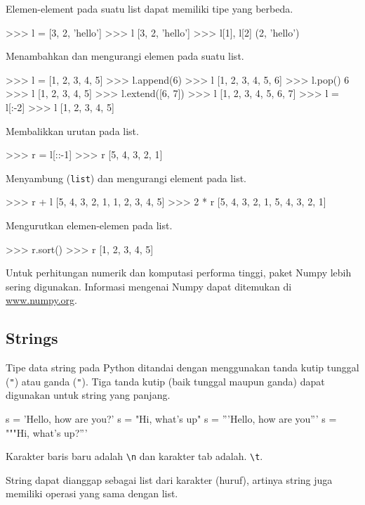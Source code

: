\documentclass[a4paper,11pt]{extarticle}
\begin{document}
Elemen-element pada suatu list dapat memiliki tipe yang berbeda.
\begin{pyconcode}
>>> l = [3, 2, 'hello']
>>> l
[3, 2, 'hello']
>>> l[1], l[2]
(2, 'hello')
\end{pyconcode}

Menambahkan dan mengurangi elemen pada suatu list.
\begin{pyconcode}
>>> l = [1, 2, 3, 4, 5]
>>> l.append(6)
>>> l
[1, 2, 3, 4, 5, 6]
>>> l.pop()
6
>>> l
[1, 2, 3, 4, 5]
>>> l.extend([6, 7])
>>> l
[1, 2, 3, 4, 5, 6, 7]
>>> l = l[:-2]
>>> l
[1, 2, 3, 4, 5]
\end{pyconcode}

Membalikkan urutan pada list.
\begin{pyconcode}
>>> r = l[::-1]
>>> r
[5, 4, 3, 2, 1]
\end{pyconcode}

Menyambung (\texttt{list}) dan mengurangi element pada list.
\begin{pyconcode}
>>> r + l
[5, 4, 3, 2, 1, 1, 2, 3, 4, 5]
>>> 2 * r
[5, 4, 3, 2, 1, 5, 4, 3, 2, 1]
\end{pyconcode}

Mengurutkan elemen-elemen pada list.
\begin{pyconcode}
>>> r.sort()
>>> r
[1, 2, 3, 4, 5]
\end{pyconcode}


Untuk perhitungan numerik dan komputasi performa tinggi, paket
\textsf{Numpy} lebih sering digunakan. Informasi mengenai \textsf{Numpy}
dapat ditemukan di \url{www.numpy.org}.


\subsection{Strings}

Tipe data string pada Python ditandai dengan menggunakan tanda
kutip tunggal (\texttt{"}) atau ganda (\texttt{"}). Tiga tanda kutip
(baik tunggal maupun ganda) dapat digunakan untuk string yang panjang.
\begin{pyconcode}
s = 'Hello, how are you?'
s = "Hi, what's up"
s = '''Hello, 
       how are you'''
s = """Hi,
   what's up?'''
\end{pyconcode}

Karakter baris baru adalah \verb|\n| dan karakter tab adalah.
\verb|\t|.

String dapat dianggap sebagai list dari karakter (huruf), artinya string
juga memiliki operasi yang sama dengan list.
\end{document}
